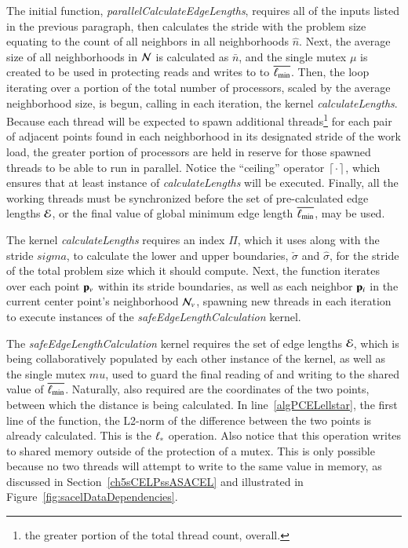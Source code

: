 
The initial function, \textit{parallelCalculateEdgeLengths}, requires all of the inputs listed in the previous paragraph, then calculates the stride with the problem size equating to the count of all neighbors in all neighborhoods $\hat{n}$. Next, the average size of all neighborhoods in $\mathcal{N}$ is calculated as $\bar{n}$, and the single mutex $\mu$ is created to be used in protecting reads and writes to to $\overline{\ell_\text{min}}$. Then, the loop iterating over a portion of the total number of processors, scaled by the average neighborhood size, is begun, calling in each iteration, the kernel \textit{calculateLengths}. Because each thread will be expected to spawn additional threads\footnote{the greater portion of the total thread count, overall.} for each pair of adjacent points found in each neighborhood in its designated stride of the work load, the greater portion of processors are held in reserve for those spawned threads to be able to run in parallel. Notice the ``ceiling'' operator $\left\lceil\cdot\right\rceil$, which ensures that at least instance of \textit{calculateLengths} will be executed. Finally, all the working threads must be synchronized before the set of pre-calculated edge lengths $\mathcal{E}$, or the final value of global minimum edge length $\overline{\ell_\text{min}}$, may be used.

The kernel \textit{calculateLengths} requires an index $\Pi$, which it uses along with the stride $sigma$, to calculate the lower and upper boundaries, $\check{\sigma}$ and $\hat{\sigma}$, for the stride of the total problem size which it should compute. Next, the function iterates over each point $\mathbf{p}_v$ within its stride boundaries, as well as each neighbor $\mathbf{p}_i$ in the current center point's neighborhood $\mathcal{N}_v$, spawning new threads in each iteration to execute instances of the \textit{safeEdgeLengthCalculation} kernel.

The \textit{safeEdgeLengthCalculation} kernel requires the set of edge lengths $\mathcal{E}$, which is being collaboratively populated by each other instance of the kernel, as well as the single mutex $mu$, used to guard the final reading of and writing to the shared value of $\overline{\ell_\text{min}}$. Naturally, also required are the coordinates of the two points, between which the distance is being calculated. In line~\ref{algPCELellstar}, the first line of the function, the L2-norm of the difference between the two points is already calculated. This is the $\ell_\ast$ operation. Also notice that this operation writes to shared memory outside of the protection of a mutex. This is only possible because no two threads will attempt to write to the same value in memory, as discussed in Section~\ref{ch5sCELPssASACEL} and illustrated in Figure~\ref{fig:sacelDataDependencies}.

